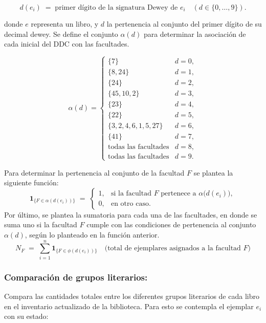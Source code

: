 \documentclass[spanish]{ieee_upb}
\begin{document}
\[
  d(e_i)\;=\;\text{primer dígito de la signatura Dewey de }e_i
  \quad (d\in\{0,\dots,9\}).
\]

donde \(e\) representa un libro, y \(d\) la pertenencia al conjunto del primer dígito de su decimal dewey. Se define el conjunto \(\alpha(d)\) para determinar la asociación de cada inicial del DDC con las facultades.

\[
  \alpha(d)=
  \begin{cases}
    \{7\}                         & d=0,\\
    \{8,24\}                      & d=1,\\
    \{24\}                        & d=2,\\
    \{45,10,2\}                   & d=3,\\
    \{23\}                        & d=4,\\
    \{22\}                        & d=5,\\
    \{3,2,4,6,1,5,27\}            & d=6,\\
    \{41\}                        & d=7,\\
    \text{todas las facultades}   & d=8,\\
    \text{todas las facultades}   & d=9.
  \end{cases}
\]

Para determinar la pertenencia al conjunto de la facultad \(F\) se plantea la siguiente función:
\[
  \mathbf 1_{\{F\in\alpha(d(e_i))\}} \;=\;
  \begin{cases}
    1, & \text{si la facultad }F\text{ pertenece a }\alpha\bigl(d(e_i)\bigr),\\
    0, & \text{en otro caso.}
  \end{cases}
\]
Por último, se plantea la sumatoria para cada una de las facultades, en donde se suma uno si la facultad \(F\) cumple con las condiciones de pertenencia al conjunto \(\alpha(d)\), según lo planteado en la función anterior. 
\[
  N_F
  \;=\;
  \sum_{i=1}^{n}
    \mathbf 1_{\{F\in\phi(d(e_i))\}}
  \quad
  \bigl(\text{total de ejemplares asignados a la facultad }F\bigr)
\]

\subsubsection{Comparación de grupos literarios: }
Compara las cantidades totales entre los diferentes grupos literarios de cada libro en el inventario actualizado de la biblioteca. Para esto se contempla el ejemplar \(e_i\) con su estado:
\end{document}
